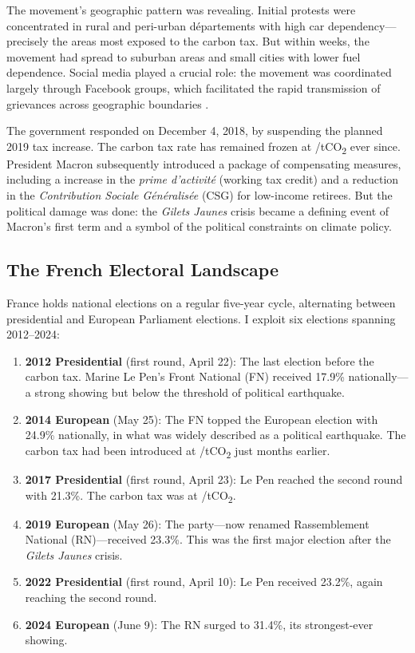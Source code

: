 \documentclass[12pt]{article}
\newcommand{\rn}{Rassemblement National}
\newcommand{\gj}{\textit{Gilets Jaunes}}
\newcommand{\depts}{d\'{e}partements}
\begin{document}
The movement's geographic pattern was revealing. Initial protests were concentrated in rural and peri-urban \depts{} with high car dependency---precisely the areas most exposed to the carbon tax. But within weeks, the movement had spread to suburban areas and small cities with lower fuel dependence. Social media played a crucial role: the movement was coordinated largely through Facebook groups, which facilitated the rapid transmission of grievances across geographic boundaries \citep{cage2020social}.

The government responded on December 4, 2018, by suspending the planned 2019 tax increase. The carbon tax rate has remained frozen at /tCO\textsubscript{2} ever since. President Macron subsequently introduced a package of compensating measures, including a  increase in the \textit{prime d'activit\'{e}} (working tax credit) and a reduction in the \textit{Contribution Sociale G\'{e}n\'{e}ralis\'{e}e} (CSG) for low-income retirees. But the political damage was done: the \gj{} crisis became a defining event of Macron's first term and a symbol of the political constraints on climate policy.

\subsection{The French Electoral Landscape}

France holds national elections on a regular five-year cycle, alternating between presidential and European Parliament elections. I exploit six elections spanning 2012--2024:

\begin{enumerate}
    \item \textbf{2012 Presidential} (first round, April 22): The last election before the carbon tax. Marine Le Pen's Front National (FN) received 17.9\% nationally---a strong showing but below the threshold of political earthquake.
    \item \textbf{2014 European} (May 25): The FN topped the European election with 24.9\% nationally, in what was widely described as a political earthquake. The carbon tax had been introduced at /tCO\textsubscript{2} just months earlier.
    \item \textbf{2017 Presidential} (first round, April 23): Le Pen reached the second round with 21.3\%. The carbon tax was at /tCO\textsubscript{2}.
    \item \textbf{2019 European} (May 26): The party---now renamed \rn{} (RN)---received 23.3\%. This was the first major election after the \gj{} crisis.
    \item \textbf{2022 Presidential} (first round, April 10): Le Pen received 23.2\%, again reaching the second round.
    \item \textbf{2024 European} (June 9): The RN surged to 31.4\%, its strongest-ever showing.
\end{enumerate}
\end{document}
